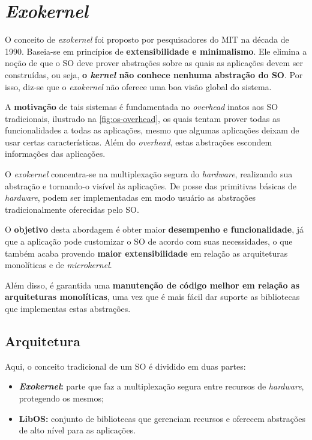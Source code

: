 \chapter{\textit{Exokernel}}
O conceito de \textit{exokernel} foi proposto por pesquisadores do MIT na década de 1990. Baseia-se em princípios de \textbf{extensibilidade e minimalismo}. Ele elimina a noção de que o SO deve prover abstrações sobre as quais as aplicações devem ser construídas, ou seja, \textbf{o \textit{kernel} não conhece nenhuma abstração do SO}. Por isso, diz-se que o \textit{exokernel} não oferece uma boa visão global do sistema.

A \textbf{motivação} de tais sistemas é fundamentada no \textit{overhead} inatos aos SO tradicionais, ilustrado na \ref{fig:os-overhead}, os quais tentam prover todas as funcionalidades a todas as aplicações, mesmo que algumas aplicações deixam de usar certas características. Além do \textit{overhead}, estas abstrações escondem informações das aplicações.

O \textit{exokernel} concentra-se na multiplexação segura do \textit{hardware}, realizando sua abstração e tornando-o visível às aplicações. De posse das primitivas básicas de \textit{hardware}, podem ser implementadas em modo usuário as abstrações tradicionalmente oferecidas pelo SO.

O \textbf{objetivo} desta abordagem é obter maior \textbf{desempenho e funcionalidade}, já que a aplicação pode customizar o SO de acordo com suas necessidades, o que também acaba provendo \textbf{maior extensibilidade} em relação as arquiteturas monolíticas e de \textit{microkernel}.

Além disso, é garantida uma \textbf{manutenção de código melhor em relação as arquiteturas monolíticas}, uma vez que é mais fácil dar suporte as bibliotecas que implementas estas abstrações.

\section{Arquitetura}
Aqui, o conceito tradicional de um SO é dividido em duas partes:
\begin{itemize}
  \item \textbf{\textit{Exokernel}:} parte que faz a multiplexação segura entre recursos de \textit{hardware}, protegendo os mesmos;

  \item \textbf{LibOS:} conjunto de bibliotecas que gerenciam recursos e oferecem abstrações de alto nível para as aplicações.
\end{itemize}

